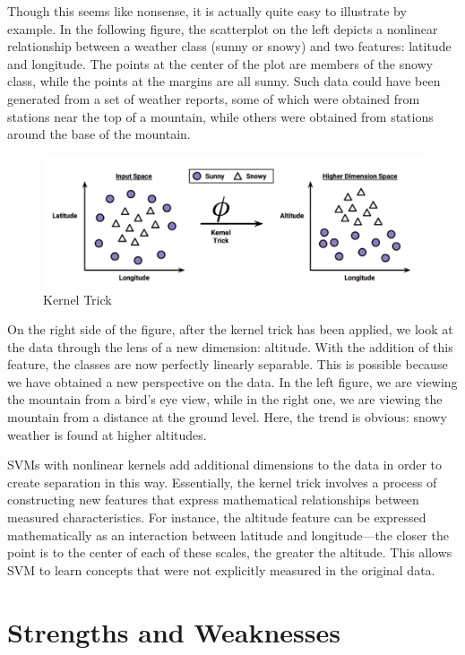 \documentclass[
]{article}
\begin{document}
Though this seems like nonsense, it is actually quite easy to illustrate
by example. In the following figure, the scatterplot on the left depicts
a nonlinear relationship between a weather class (sunny or snowy) and
two features: latitude and longitude. The points at the center of the
plot are members of the snowy class, while the points at the margins are
all sunny. Such data could have been generated from a set of weather
reports, some of which were obtained from stations near the top of a
mountain, while others were obtained from stations around the base of
the mountain.

\begin{figure}

{\centering \includegraphics[width=0.5\linewidth,]{images/kerneltrick} 

}

\caption{Kernel Trick}\label{fig:fig6}
\end{figure}

On the right side of the figure, after the kernel trick has been
applied, we look at the data through the lens of a new dimension:
altitude. With the addition of this feature, the classes are now
perfectly linearly separable. This is possible because we have obtained
a new perspective on the data. In the left figure, we are viewing the
mountain from a bird's eye view, while in the right one, we are viewing
the mountain from a distance at the ground level. Here, the trend is
obvious: snowy weather is found at higher altitudes.

SVMs with nonlinear kernels add additional dimensions to the data in
order to create separation in this way. Essentially, the kernel trick
involves a process of constructing new features that express
mathematical relationships between measured characteristics. For
instance, the altitude feature can be expressed mathematically as an
interaction between latitude and longitude---the closer the point is to
the center of each of these scales, the greater the altitude. This
allows SVM to learn concepts that were not explicitly measured in the
original data.

\hypertarget{strengths-and-weaknesses}{%
\section{Strengths and Weaknesses}\label{strengths-and-weaknesses}}
\end{document}

